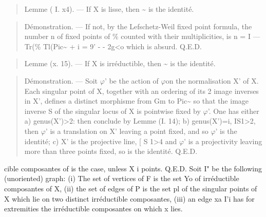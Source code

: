 \documentclass[11pt]{article}
\theoremstyle{plain}
\theoremstyle{definition}
\theoremstyle{remark}
\begin{document}
\begin{quote}Lemme ( I. x4). --- If X is lisse, then \textasciitilde{} is the identit\'e.\end{quote}
\begin{quote}D\'emonstration. --- If not, by the Lefschetz-Weil fixed point formula, the number n of fixed points of \% counted with their multiplicities, is n = I --- Tr(\% Tl(Pic\textasciitilde{} + i = 9' - - 2g<o which is absurd. Q.E.D.\end{quote}
\begin{quote}Lemme (x. 15). --- If X is irr\'eductible, then \textasciitilde{} is the identit\'e.\end{quote}
\begin{quote}D\'emonstration. --- Soit $\varphi$' be the action of $\varphi$on the normalisation X' of X. Each singular point of X, together with an ordering of its 2 image inverses in X', defines a distinct morphisme from Gm to Pic\textasciitilde{} so that the image inverse S of the singular locus of X is pointwise fixed by $\varphi$'. One has either a) genus(X')>2: then conclude by Lemme (I. 14); b) genus(X')=i, IS1>2, then $\varphi$' is a translation on X' leaving a point fixed, and so $\varphi$' is the identit\'e; c) X' is the projective line, [ S 1>4 and $\varphi$' is a projectivity leaving more than three points fixed, so is the identit\'e. Q.E.D.\end{quote}
cible composantes of is the case, unless X i points. Q.E.D. Soit I" be the following (unoriented) graph: (i) The set of vertices of F is the set Yo of irr\'eductible composantes of X, (ii) the set of edges of P is the set pl of the singular points of X which lie on two distinct irr\'eductible composantes, (iii) an edge xa I'i has for extremities the irr\'eductible composantes on which x lies.
\end{document}
